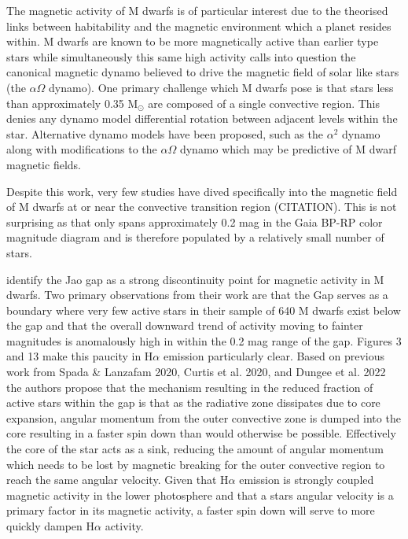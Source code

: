 The magnetic activity of M dwarfs is of particular interest due to the
theorised links between habitability and the magnetic environment which a
planet resides within. M dwarfs are known to be more magnetically active than
earlier type stars while simultaneously this same high activity calls into
question the canonical magnetic dynamo believed to drive the magnetic field of
solar like stars (the $\alpha\Omega$ dynamo). One primary challenge which M
dwarfs pose is that stars less than approximately 0.35 M$_{\odot}$ are composed
of a single convective region. This denies any dynamo model differential
rotation between adjacent levels within the star. Alternative dynamo models
have been proposed, such as the $\alpha^{2}$ dynamo along with modifications to
the $\alpha\Omega$ dynamo which may be predictive of M dwarf magnetic fields.

Despite this work, very few studies have dived specifically into the magnetic
field of M dwarfs at or near the convective transition region
{\color{red}(CITATION)}. This is not surprising as that only spans
approximately 0.2 mag in the Gaia BP-RP color magnitude diagram and is
therefore populated by a relatively small number of stars. 

\citep{Jao2023} identify the Jao gap as a strong discontinuity point for
magnetic activity in M dwarfs. Two primary observations from their work are
that the Gap serves as a boundary where very few active stars in their sample
of 640 M dwarfs exist below the gap and that the overall downward trend of
activity moving to fainter magnitudes is anomalously high in within the 0.2 mag
range of the gap. \citeauthor{Jao2023} Figures 3 and 13 make this paucity in
H$\alpha$ emission particularly clear. Based on previous work from
{\color{red}Spada \& Lanzafam 2020}, {\color{red}Curtis et al. 2020, and Dungee
et al. 2022} the authors propose that the mechanism resulting in the reduced
fraction of active stars within the gap is that as the radiative zone dissipates
due to core expansion, angular momentum from the outer convective zone is
dumped into the core resulting in a faster spin down than would otherwise be
possible. Effectively the core of the star acts as a sink, reducing the amount
of angular momentum which needs to be lost by magnetic breaking for the outer
convective region to reach the same angular velocity. Given that H$\alpha$
emission is strongly coupled magnetic activity in the lower photosphere and
that a stars angular velocity is a primary factor in its magnetic activity, a
faster spin down will serve to more quickly dampen H$\alpha$ activity.

